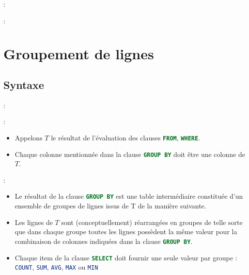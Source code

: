 \documentclass[10pt]{beamer}
\begin{document}
\begin{frame}{\secname : \subsecname}
    
\end{frame}

\begin{frame}{\secname : \subsecname}
    
\end{frame}

\section{Groupement de lignes}
\tocss
\subsection{Syntaxe}
\begin{frame}{\secname : \subsecname}
    
\end{frame}

\begin{frame}{\secname : \subsecname}
    \begin{itemize}
        \item Appelons $T$ le résultat de l'évaluation des clauses \lstinline[language=sql]!FROM!, \lstinline[language=sql]!WHERE!.
        \item Chaque colonne mentionnée dans la clause \lstinline[language=sql]!GROUP BY! doit être une colonne de $T$.
    \end{itemize}
\end{frame}

\begin{frame}{\secname : \subsecname}
    \begin{itemize}
        \item Le résultat de la clause \lstinline[language=sql]!GROUP BY! est une table intermédiaire constituée d'un ensemble de groupes de lignes issus de T de la manière suivante.
        \item Les lignes de $T$ sont (conceptuellement) réarrangées en groupes de telle sorte que dans chaque groupe toutes les lignes possèdent la même valeur pour la combinaison de colonnes indiquées dans la clause \lstinline[language=sql]!GROUP BY!.
        \item Chaque item de la clause \lstinline[language=sql]!SELECT! doit fournir une seule valeur par groupe : \lstinline[language=sql]!COUNT!, \lstinline[language=sql]!SUM!, \lstinline[language=sql]!AVG!, \lstinline[language=sql]!MAX! ou \lstinline[language=sql]!MIN!
    \end{itemize}
\end{frame}
\end{document}
